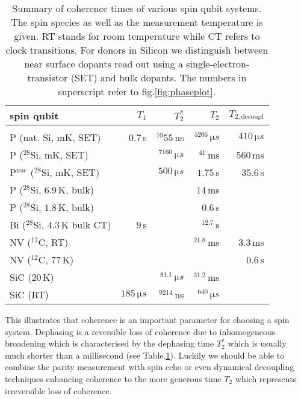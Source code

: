 \bgroup
\def\arraystretch{1.3}%
\begin{table}[H]
	\begin{tabular}{lrrrr}
		\hline
		spin qubit & $T_1$ & $T_2^{*}$ & $T_2$ & $T_{2,\textrm{decoupl}}$ \\ \hline \\
		P (nat. Si, mK, SET) \cite{Pla2012}& $0.7\, $s & $^{10}55\, $ns  & $^5206\, \si{\micro s}$ & $410\, \si{\micro s}$  \\
		P ($^{28}$Si, mK, SET) \cite{Muhonen2014}&  & $^7160\, \si{\micro s}$  & $^41\, $ms & $560\, $ms \\
		P$^{\text{nuc}}$ ($^{28}$Si, mK, SET) \cite{Muhonen2014}& & $500\, \si{\micro s}$ & $1.75\, $s & $35.6\, $s \\
		P ($^{28}$Si, $6.9\, $K, bulk) \cite{Morley2010}& &  & $14\, $ms &  \\
		P ($^{28}$Si, $1.8\, $K, bulk) \cite{Tyryshkin2011}& &  & $0.6\, $s &  \\
		Bi ($^{28}$Si, $4.3\, $K bulk CT) \cite{Wolfowicz2013} & $9\, $s &  & $^12.7\, $s &\\
		NV ($^{12}$C, RT) \cite{Balasubramanian2009,Bar-Gill2013} & & & $^21.8\, $ms & $3.3\, $ms \\
		NV ($^{12}$C, $77\, $K) \cite{Bar-Gill2013} & & &  & $0.6\, $s \\
		SiC ($20\, $K) \cite{Christle2014} & & $^81.1\, \si{\micro s}$ & $^31.2\, $ms &  \\
		SiC (RT) \cite{Koehl2011} & $185\, \si{\micro s}$ & $^9214\, $ns & $^640\, \si{\micro s}$ &   \\
		\hline
	\end{tabular} 
	\caption{Summary of coherence times of various spin qubit systems. The spin species as well as the measurement temperature is given. RT stands for room temperature while CT refers to clock transitions. For donors in Silicon we distinguish between near surface dopants read out using a single-electron-transistor (SET) and bulk dopants. The numbers in superscript refer to fig.\@ \ref{fig:phaseplot}.}
	\label{TAB:qubits}
\end{table}
\egroup


This illustrates that coherence is an important parameter for choosing a spin system. Dephasing is a reversible loss of coherence due to inhomogeneous broadening which is characterised by the dephasing time $T_2^*$ which is usually much shorter than a millisecond (see Table.\@ \ref{TAB:qubits}). Luckily we should be able to combine the parity measurement with spin echo or even dynamical decoupling techniques enhancing coherence to the more generous time $T_2$ which represents irreversible loss of coherence.

